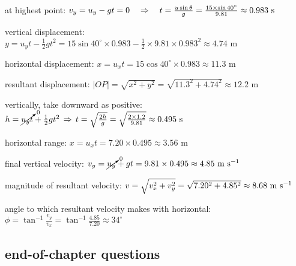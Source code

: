 		
\begin{soln} at highest point: $v_y = u_y - gt = 0 \quad \Rightarrow \quad t = \frac{u\sin\theta}{g} = \frac{15\times\sin40^\circ}{9.81} \approx 0.983 \text{ s}$

vertical displacement: $y = u_y t - \frac{1}{2}gt^2 = 15\sin40^\circ \times 0.983 - \frac{1}{2}\times 9.81 \times 0.983^2 \approx 4.74 \text{ m}$

horizontal displacement: $x = u_x t = 15\cos40^\circ \times 0.983 \approx 11.3 \text{ m}$

resultant displacement: $|OP| = \sqrt{x^2 +y^2} = \sqrt{11.3^2 + 4.74^2} \approx 12.2 \text{ m}$ 
\end{soln}
\newpage


\begin{soln}
    
vertically, take downward as positive: $h = \cancelto{0}{u_y t} + \frac{1}{2}gt^2 \, \Rightarrow \, t = \sqrt{\frac{2h}{g}} = \sqrt{\frac{2\times1.2}{9.81}} \approx 0.495 \text{ s} $

horizontal range: $x = u_x t = 7.20 \times 0.495 \approx 3.56 \text{ m}$

final vertical velocity: $v_y = \cancelto{0}{u_y} + gt = 9.81 \times 0.495 \approx 4.85 \text{ m s$^{-1}$}$

magnitude of resultant velocity: $v = \sqrt{v_x^2 + v_y^2} = \sqrt{7.20^2 + 4.85^2} \approx 8.68 \text{ m s$^{-1}$}$

angle to which resultant velocity makes with horizontal: $\phi = \tan^{-1}\frac{v_y}{v_x} = \tan^{-1}\frac{4.85}{7.20} \approx 34^\circ$ 
\end{soln} 

\subsection{end-of-chapter questions}

